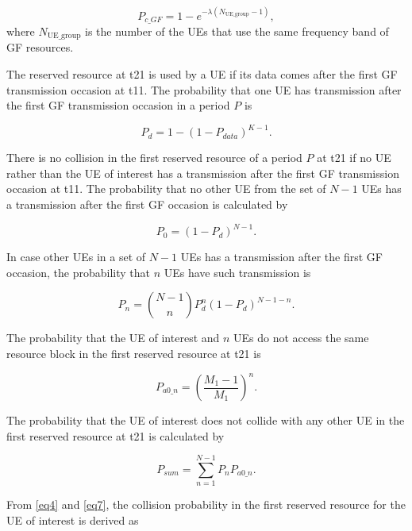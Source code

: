 \documentclass[conference]{IEEEtran}
\begin{document}
\begin{equation}
P_{c\_GF} = 1 - e^{-\lambda(N_\mathrm{UE\_group}-1)},\label{eq2}
\end{equation}
where $N_\mathrm{UE\_group}$ is the number of the UEs that use the same frequency band of GF resources.

The reserved resource at t21 is used by a UE if its data comes after the first GF transmission occasion at t11. The probability that one UE has transmission after the first GF transmission occasion in a period $P$ is

\begin{equation}
P_{d} = 1 - (1-P_{data})^{K-1}.\label{eq3}
\end{equation}

There is no collision in the first reserved resource of a period $P$ at t21 if no UE rather than the UE of interest has a transmission after the first GF transmission occasion at t11. The probability that no other UE from the set of $N-1$ UEs has a transmission after the first GF occasion is calculated by

\begin{equation}
P_{0} = (1-P_{d})^{N-1}.\label{eq4}
\end{equation}

In case other UEs in a set of $N-1$ UEs has a transmission after the first GF occasion, the probability that $n$  UEs have such transmission is

\begin{equation}
P_{n} = \binom {N-1}{n}P_{d}^{n}(1-P_{d})^{N-1-n}.\label{eq5}
\end{equation}

The probability that the UE of interest and $n$ UEs do not access the same resource block in the first reserved resource at t21 is

\begin{equation}
P_{a0\_n} = (\frac {M_{1}-1}{M_{1}})^{n}.\label{eq6}
\end{equation}

The probability that the UE of interest does not collide with any other UE in the first reserved resource at t21 is calculated by

\begin{equation}
P_{sum} = \sum_{n=1}^{N-1} P_{n}P_{a0\_n}.\label{eq7}
\end{equation}

From \eqref{eq4} and \eqref{eq7}, the collision probability in the first reserved resource for the UE of interest is derived as
\end{document}
